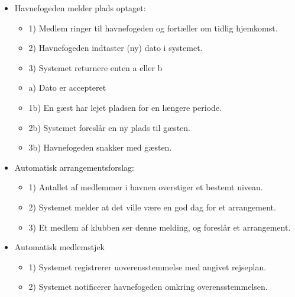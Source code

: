 \begin{itemize}
  \item Havnefogeden melder plads optaget:
  \begin{itemize}
    \item 1) Medlem ringer til havnefogeden og fortæller om tidlig hjemkomst.
    \item 2) Havnefogeden indtaster (ny) dato i systemet.
    \item 3) Systemet returnere enten a eller b
    \item a) Dato er accepteret
    \item 1b) En gæst har lejet pladsen for en længere periode.
    \item 2b) Systemet foreslår en ny plads til gæsten.
    \item 3b) Havnefogeden snakker med gæsten.
  \end{itemize}

  \item Automatisk arrangementsforslag:
  \begin{itemize}
    \item 1) Antallet af medlemmer i havnen overstiger et bestemt niveau.
    \item 2) Systemet melder at det ville være en god dag for et arrangement.
    \item 3) Et medlem af klubben ser denne melding, og foreslår et arrangement.
  \end{itemize}

  \item Automatisk medlemstjek
  \begin{itemize}
    \item 1) Systemet registrerer uoverensstemmelse med angivet rejseplan.
    \item 2) Systemet notificerer havnefogeden omkring overensstemmelsen.
  \end{itemize}
  

\end{itemize}

